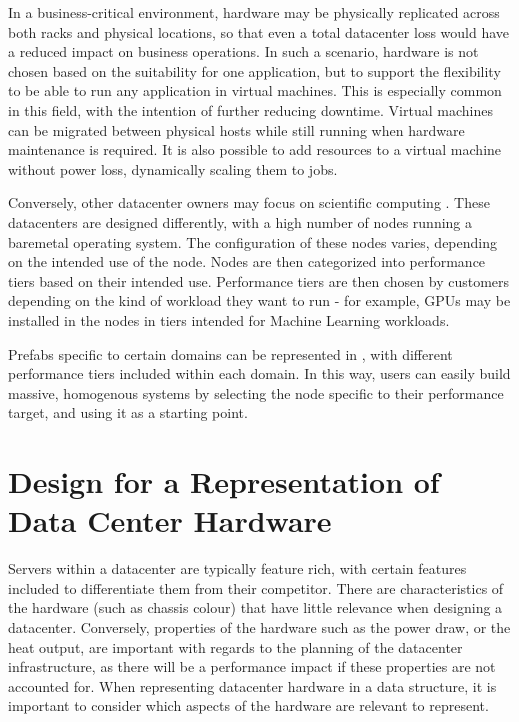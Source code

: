 \documentclass[11pt]{article}
\begin{document}
		In a business-critical environment, hardware may be physically replicated across both racks and physical locations, so that even a total datacenter loss would have a reduced impact on business operations.
		In such a scenario, hardware is not chosen based on the suitability for one application, but to support the flexibility to be able to run any application in virtual machines.
		This is especially common in this field, with the intention of further reducing downtime.
		Virtual machines can be migrated between physical hosts while still running when hardware maintenance is required.
		It is also possible to add resources to a virtual machine without power loss, dynamically scaling them to jobs.

		Conversely, other datacenter owners may focus on scientific computing \cite{SURF2020}.
		These datacenters are designed differently, with a high number of nodes running a baremetal operating system.
		The configuration of these nodes varies, depending on the intended use of the node.
		Nodes are then categorized into performance tiers based on their intended use.
		Performance tiers are then chosen by customers depending on the kind of workload they want to run - for example, GPUs may be installed in the nodes in tiers intended for Machine Learning workloads.

		Prefabs specific to certain domains can be represented in \opendc{}, with different performance tiers included within each domain.
		In this way, users can easily build massive, homogenous systems by selecting the node specific to their performance target, and using it as a starting point.

\newpage

\section{Design for a Representation of Data Center Hardware} \label{sec:design}
	Servers within a datacenter are typically feature rich, with certain features included to differentiate them from their competitor.
	There are characteristics of the hardware (such as chassis colour) that have little relevance when designing a datacenter.
	Conversely, properties of the hardware such as the power draw, or the heat output, are important with regards to the planning of the datacenter infrastructure, as there will be a performance impact if these properties are not accounted for.
	When representing datacenter hardware in a data structure, it is important to consider which aspects of the hardware are relevant to represent.
	
\end{document}
